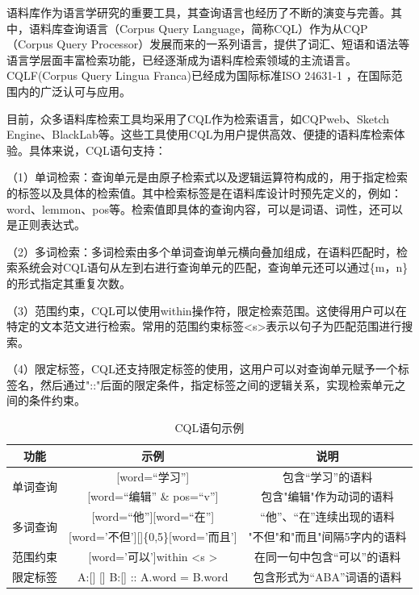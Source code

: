 \documentclass[11pt]{article}
\begin{document}
\begin{CJK*}{UTF8}{gbsn}
语料库作为语言学研究的重要工具，其查询语言也经历了不断的演变与完善。其中，语料库查询语言（Corpus Query Language，简称CQL）作为从CQP（Corpus Query Processor）发展而来的一系列语言，提供了词汇、短语和语法等语言学层面丰富检索功能\cite{wuliangping}，已经逐渐成为语料库检索领域的主流语言。CQLF(Corpus Query Lingua Franca)已经成为国际标准ISO 24631-1 \cite{banski-etal-2016-corpus}，在国际范围内的广泛认可与应用。

目前，众多语料库检索工具均采用了CQL作为检索语言，如CQPweb\cite{hardie2012cqpweb}、Sketch Engine\cite{sketchengine1}、BlackLab\cite{blacklab}等。这些工具使用CQL为用户提供高效、便捷的语料库检索体验。具体来说，CQL语句支持：

（1）单词检索：查询单元是由原子检索式以及逻辑运算符构成的，用于指定检索的标签以及具体的检索值。其中检索标签是在语料库设计时预先定义的，例如：word、lemmon、pos等。检索值即具体的查询内容，可以是词语、词性，还可以是正则表达式。

（2）多词检索：多词检索由多个单词查询单元横向叠加组成，在语料匹配时，检索系统会对CQL语句从左到右进行查询单元的匹配，查询单元还可以通过\{m，n\}的形式指定其重复次数。

（3）范围约束，CQL可以使用within操作符，限定检索范围。这使得用户可以在特定的文本范文进行检索。常用的范围约束标签\textless s\textgreater 表示以句子为匹配范围进行搜索。

（4）限定标签，CQL还支持限定标签的使用，这用户可以对查询单元赋予一个标签名，然后通过"::"后面的限定条件，指定标签之间的逻辑关系，实现检索单元之间的条件约束。

\begin{table}[h]
	\begin{center}
		\begin{tabular}{c|c|c}
			\hline \bf 功能 & \bf 示例 & \bf 说明 \\ \hline
			\multirow{2}{*}{单词查询}& [word=“学习”] & 包含“学习”的语料 \\ \cline{2-3} & [word=“编辑” \& pos=“v”] & 包含"编辑"作为动词的语料 \\ \cline{1-3}
			\multirow{2}{*}{多词查询} 
			& [word=“他”][word=“在”] & “他”、“在”连续出现的语料  \\ \cline{2-3} & [word='不但'][]\{0,5\}[word='而且'] & "不但"和"而且"间隔5字内的语料 \\ \hline
			范围约束 & [word='可以']within \textless s \textgreater & 在同一句中包含“可以”的语料 \\ \cline{1-3}
			限定标签 & A:[] [] B:[]  :: A.word = B.word & 包含形式为“ABA”词语的语料 \\
			\hline
		\end{tabular}
	\end{center}
	\caption{\label{cqltable} CQL语句示例}
\end{table}


\end{CJK*}
\end{document}
